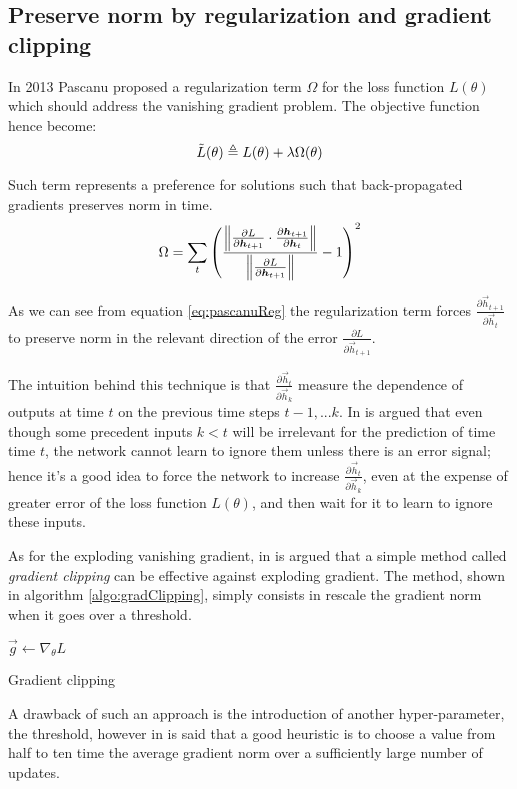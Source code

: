 \subsection{Preserve norm by regularization and gradient clipping} 

In 2013 Pascanu \cite{pascanu} proposed a regularization term $\Omega$ for the loss function $L(\theta)$ which should address the vanishing gradient problem.
The objective function hence become:
\begin{equation}
 \tilde{L}(\theta) \triangleq L(\theta) + \lambda\Omega(\theta)
\end{equation}

Such term represents a preference for solutions such that back-propagated gradients preserves norm in time.
\begin{equation}
\Omega = \sum_t \left( \frac{\left\Vert  \frac{\partial L}{\partial \boldsymbol{h}_{t+1}} \cdot \frac{\partial \boldsymbol{h}_{t+1}}{\partial \boldsymbol{h}_t}  \right\Vert}{\left\Vert \frac{\partial L}{\partial \boldsymbol{h}_{t+1}} \right\Vert} -1  \right)^2 
\label{eq:pascanuReg}
\end{equation}

As we can see from equation \ref{eq:pascanuReg} the regularization term forces $\frac{\partial \vec{h}_{t+1}}{\partial \vec{h}_t}$ to preserve norm in the relevant direction of the error $\frac{\partial L}{\partial \vec{h}_{t+1}}$.

The intuition behind this technique is that $\frac{\partial \vec{h}_{t}}{\partial \vec{h}_k}$ measure the dependence of outputs at time $t$ on the previous time steps $t-1,...k$. In \cite{pascanu} is argued that even though some precedent inputs $k<t$ will be irrelevant for the prediction of time time $t$, the network cannot learn to ignore them unless there is an error signal; hence it's a good idea to force the network to increase $\frac{\partial \vec{h}_{t}}{\partial \vec{h}_k}$, even at the expense of greater error of the loss function $L(\theta)$, and then wait for it to learn to ignore these inputs.

As for the exploding vanishing gradient, in \cite{pascanu} is argued that a simple method called \textit{gradient clipping} can be effective against exploding gradient. The method, shown in algorithm \ref{algo:gradClipping}, simply consists in rescale the gradient norm when it goes over a threshold.

\begin{algorithm}[]
$\vec{g} \gets \nabla_{\theta} L$\\
\caption{Gradient clipping}
\label{algo:gradClipping}
\end{algorithm}

A drawback of such an approach is the introduction of another hyper-parameter, the threshold, however in \cite{pascanu} is said that a good heuristic
is to choose a value from half to ten time the average gradient norm over a sufficiently large number of updates.